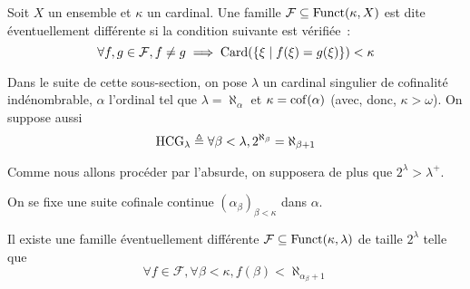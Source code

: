 \begin{definition}
  Soit $X$ un ensemble et $\kappa$ un cardinal. Une famille
  $\mathcal F\subseteq\operatorname{Funct}(\kappa,X)$ est dite éventuellement différente si
  la condition suivante est vérifiée~:
  \[\forall f,g \in \mathcal F, f \neq g \implies
  \operatorname{Card}(\{\xi\mid f(\xi) = g(\xi)\}) < \kappa\]
\end{definition}

\begin{notation}
  Dans le suite de cette sous-section, on pose $\lambda$ un cardinal singulier
  de cofinalité indénombrable, $\alpha$ l'ordinal tel que
  $\lambda = \aleph_\alpha$ et $\kappa = \operatorname{cof}(\alpha)$ (avec, donc,
  $\kappa > \omega$). On suppose aussi
  \[\operatorname{HCG}_\lambda \triangleq \forall \beta < \lambda, 2^{\aleph_\beta} = \aleph_{\beta + 1}
  \]

  Comme nous allons procéder par l'absurde, on supposera de plus que
  $2^\lambda > \lambda^+$.

  On se fixe une suite cofinale continue $(\alpha_{\beta})_{\beta < \kappa}$ dans
  $\alpha$.
\end{notation}

\begin{proposition}
  Il existe une famille éventuellement différente
  $\mathcal F\subseteq\operatorname{Funct}(\kappa,\lambda)$ de taille $2^\lambda$ telle que
  \[\forall f\in\mathcal F, \forall \beta < \kappa,
  f(\beta) < \aleph_{\alpha_\beta + 1}\]
\end{proposition}


